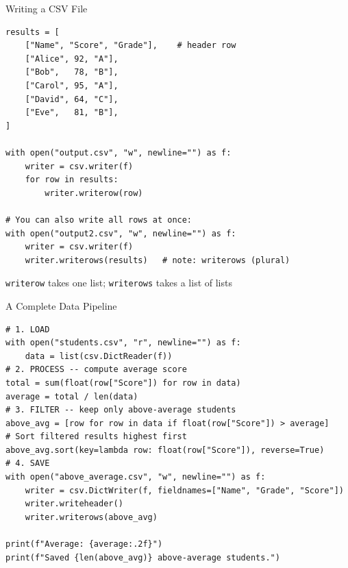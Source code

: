 \documentclass{csbeamer}
\begin{document}
\begin{frame}[fragile]{Writing a CSV File}
    \begin{lstlisting}
results = [
    ["Name", "Score", "Grade"],    # header row
    ["Alice", 92, "A"],
    ["Bob",   78, "B"],
    ["Carol", 95, "A"],
    ["David", 64, "C"],
    ["Eve",   81, "B"],
]

with open("output.csv", "w", newline="") as f:
    writer = csv.writer(f)
    for row in results:
        writer.writerow(row)

# You can also write all rows at once:
with open("output2.csv", "w", newline="") as f:
    writer = csv.writer(f)
    writer.writerows(results)   # note: writerows (plural)
    \end{lstlisting}

    \pause

    \texttt{writerow} takes one list; \texttt{writerows} takes a list of lists

\end{frame}

\begin{frame}[fragile]{A Complete Data Pipeline}

    \begin{lstlisting}
# 1. LOAD
with open("students.csv", "r", newline="") as f:
    data = list(csv.DictReader(f))
# 2. PROCESS -- compute average score
total = sum(float(row["Score"]) for row in data)
average = total / len(data)
# 3. FILTER -- keep only above-average students
above_avg = [row for row in data if float(row["Score"]) > average]
# Sort filtered results highest first
above_avg.sort(key=lambda row: float(row["Score"]), reverse=True)
# 4. SAVE
with open("above_average.csv", "w", newline="") as f:
    writer = csv.DictWriter(f, fieldnames=["Name", "Grade", "Score"])
    writer.writeheader()
    writer.writerows(above_avg)

print(f"Average: {average:.2f}")
print(f"Saved {len(above_avg)} above-average students.")
    \end{lstlisting}
\end{frame}
\end{document}
